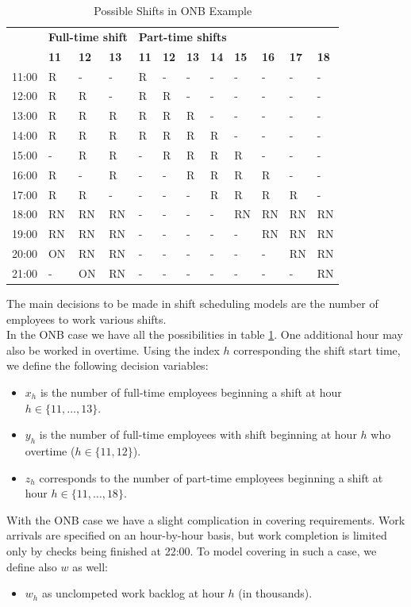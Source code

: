 \documentclass[a4paper,10 pt,titlepage,twoside]{book}
\theoremstyle{plain}
\theoremstyle{definition}
\theoremstyle{remark}
\begin{document}
\begin{table}[]\caption{\label{table:Shiftscheduling2}Possible Shifts in ONB Example}
	\begin{center}
	\begin{tabular}{llllllllllll}
		\hline\row{\textbf{Start}} & \multicolumn{3}{l}{\textbf{Full-time shift}} & \multicolumn{8}{l}{\textbf{Part-time shifts}} \\ \cline{2-12} 
		& \textbf{11} & \textbf{12} & \textbf{13} & \textbf{11} & \textbf{12} & \textbf{13} & \textbf{14} & \textbf{15} & \textbf{16} & \textbf{17} & \textbf{18} \\ \hline
		11:00 & R & - & - & R & - & - & - & - & - & - & - \\
		12:00 & R & R & - & R & R & - & - & - & - & - & - \\
		13:00 & R & R & R & R & R & R & - & - & - & - & - \\
		14:00 & R & R & R & R & R & R & R & - & - & - & - \\
		15:00 & - & R & R & - & R & R & R & R & - & - & - \\
		16:00 & R & - & R & - & - & R & R & R & R & - & - \\
		17:00 & R & R & - & - & - & - & R & R & R & R & - \\
		18:00 & RN & RN & RN & - & - & - & - & RN & RN & RN & RN \\
		19:00 & RN & RN & RN & - & - & - & - & - & RN & RN & RN \\
		20:00 & ON & RN & RN & - & - & - & - & - & - & RN & RN \\
		21:00 & - & ON & RN & - & - & - & - & - & - & - & RN \\ \hline
	\end{tabular}
	\end{center}
\end{table}
The main decisions to be made in shift scheduling models are the number of employees to work various shifts. \\In the ONB case we have all the possibilities in table \ref{table:Shiftscheduling2}. One additional hour may also be worked in overtime.
Using the index $h$ corresponding the shift start time, we define the following decision variables:
\begin{itemize}
	\item $x_{h}$ is the number of full-time employees beginning a shift at hour $h \in \{11, \dots, 13\}$.
	\item $y_{h}$ is the number of full-time employees with shift beginning at hour $h$ who overtime ($h \in \{11, 12\}$).
	\item $z_{h}$ corresponds to the number of part-time employees beginning a shift at hour $h\in\{11, \dots, 18\}$.
\end{itemize}
With the ONB case we have a slight complication in covering requirements. Work arrivals are specified on an hour-by-hour basis, but work completion is limited only by checks being finished at 22:00. To model covering in such a case, we define also $w$ as well:
\begin{itemize}
	\item $w_{h}$ as unclompeted work backlog at hour $h$ (in thousands).
\end{itemize}
\end{document}
